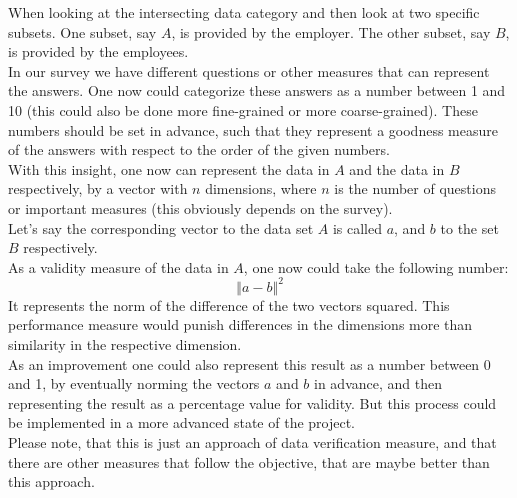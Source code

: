 \documentclass[portrait,a4paper]{article}
\begin{document}
		When looking at the intersecting data category and then look at two specific subsets.
		One subset, say $A$, is provided by the employer. The other subset, say $B$, is provided by the employees.\\
		In our survey we have different questions or other measures that can represent the answers. One now could categorize
		these answers as a number between 1 and 10 (this could also be done more fine-grained or more coarse-grained).
		These numbers should be set in advance, such that they represent a goodness measure of the answers with respect
		to the order of the given numbers.\\
		With this insight, one now can represent the data in $A$ and the data in $B$ respectively, by a vector with
		$n$ dimensions, where $n$ is the number of questions or important measures (this obviously depends on the survey).\\
		Let's say the corresponding vector to the data set $A$ is called $a$, and $b$ to the set $B$ respectively.\\
		As a validity measure of the data in $A$, one now could take the following number:
		\begin{equation*}
			{\left\Vert a - b \right\Vert}^{2}
		\end{equation*}
		It represents the norm of the difference of the two vectors squared. This performance measure would punish 
		differences in the dimensions more than similarity in the respective dimension.\\
		
		As an improvement one could also represent this result as a number between 0 and 1, by eventually norming the
		vectors $a$ and $b$ in advance, and then representing the result as a percentage value for validity. But this
		process could be implemented in a more advanced state of the project.\\
		
		Please note, that this is just an approach of data verification measure, and that there are other measures that
		follow the objective, that are maybe better than this approach.
		
\end{document}
